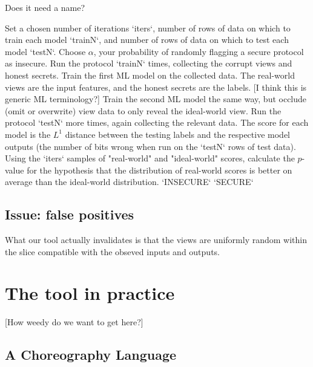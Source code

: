 \documentclass[conference]{IEEEtran}
\begin{document}
\begin{algorithm}  %
  \caption{Does it need a name?}
  \begin{algorithmic}[1]
  \STATE Set a chosen number of iterations `iters`,
         number of rows of data on which to train each model `trainN`,
         and number of rows of data on which to test each model `testN`.
  \STATE Choose $\alpha$, your probability of randomly flagging a secure protocol as insecure.
    \STATE Run the protocol `trainN` times, collecting the corrupt views and honest secrets.
    \STATE Train the first ML model on the collected data.
           The real-world views are the input features, and the honest secrets are the labels. [I think this is generic ML terminology?]
    \STATE Train the second ML model the same way, but occlude (omit or overwrite) view data to only reveal the ideal-world view.
    \STATE Run the protocol `testN` more times, again collecting the relevant data.
    \STATE The score for each model is the $L^1$ distance between the testing labels and the respective model outputs
           (\ie the number of bits wrong when run on the `testN` rows of test data).
  \ENDFOR
  \STATE Using the `iters` samples of "real-world" and "ideal-world" scores,
         calculate the $p$-value for the hypothesis that the distribution of real-world scores is better on average than the ideal-world distribution.
   \RETURN `INSECURE` \ELSE \RETURN `SECURE` \ENDIF
  \end{algorithmic}
\end{algorithm}

\subsection{Issue: false positives}

What our tool actually invalidates is that the views are uniformly random within the slice compatible with the obseved inputs and outputs. 


\section{The tool in practice}

[How weedy do we want to get here?]


\subsection{A Choreography Language}
\end{document}
